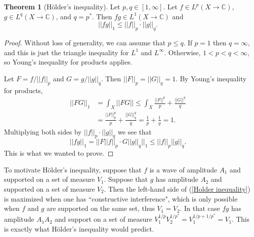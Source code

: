 \documentclass[12pt]{book}
\newcommand{\CC}{\mathbb{C}}
\theoremstyle{definition}
\newtheorem{theorem}{Theorem}[section]
\begin{document}
\begin{theorem}[H\"older's inequality]
Let $p, q \in [1, \infty]$.
Let $f \in L^p(X \to \CC)$, $g \in L^q(X \to \CC)$, and $q = p^*$.
Then $fg \in L^1(X \to \CC)$ and
\begin{equation}
\label{Holder inequality}
||fg||_1 \leq ||f||_p \cdot ||g||_q.
\end{equation}
\end{theorem}
\begin{proof}
Without loss of generality, we can assume that $p \leq q$.
If $p = 1$ then $q = \infty$, and this is just the triangle inequality for $L^1$ and $L^\infty$.
Otherwise, $1 < p < q < \infty$, so Young's inequality for products applies.

Let $F = f/||f||_p$ and $G = g/||g||_q$. Then $||F||_p = ||G||_q = 1$.
By Young's inequality for products,
\begin{align*}||FG||_1 &= \int_X ||FG|| \leq \int_X \frac{||F||^p}{p} + \frac{||G||^q}{q}\\
&= \frac{||F||_p^p}{p} + \frac{||G||_q^q}{q} = \frac{1}{p} + \frac{1}{q}  = 1.
\end{align*}
Multiplying both sides by $||f||_p \cdot ||g||_q$ we see that
$$||fg||_1 = ||F||f||_p \cdot G||g||_q||_1 \leq ||f||_p ||g||_q.$$
This is what we wanted to prove.
\end{proof}

To motivate H\"older's inequality, suppose that $f$ is a wave of amplitude $A_1$ and supported on a set of measure $V_1$.
Suppose that $g$ has amplitude $A_2$ and supported on a set of measure $V_2$.
Then the left-hand side of (\ref{Holder inequality}) is maximized when one has ``constructive interference", which is only possible when $f$ and $g$ are supported on the same set, thus $V_1 = V_2$.
In that case $fg$ has amplitude $A_1A_2$ and support on a set of measure $V_1^{1/p}V_2^{1/p^*} = V_1^{1/p+1/p^*} = V_1$.
This is exactly what H\"older's inequality would predict.
\end{document}
